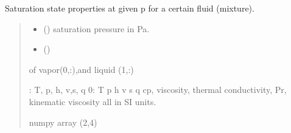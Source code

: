 \documentclass[letterpaper,10pt,english]{sphinxmanual}
\begin{document}
\begin{fulllineitems}
\label{\detokenize{fluid_properties_rp:fluid_properties_rp.p_prop_sat}}
\pysigstartsignatures
{}
\pysigstopsignatures
\sphinxAtStartPar
Saturation state properties at given p for a certain fluid (mixture).
\begin{quote}\begin{description}
\begin{itemize}
\item {} 
\sphinxAtStartPar
{} () \textendash{} saturation pressure in Pa.

\item {} 
\sphinxAtStartPar
{} () \textendash{} 

\end{itemize}

\sphinxAtStartPar

\sphinxAtStartPar
{} \textendash{}
\begin{description}
\sphinxAtStartPar
of  vapor(0,:),and liquid (1,:)

\end{description}

: T, p, h, v,s, q
0:  T p h v s q cp, viscosity, thermal conductivity, Pr, kinematic viscosity
all in SI units.


\sphinxAtStartPar
numpy array (2,4)

\end{description}\end{quote}

\end{fulllineitems}
\end{document}
